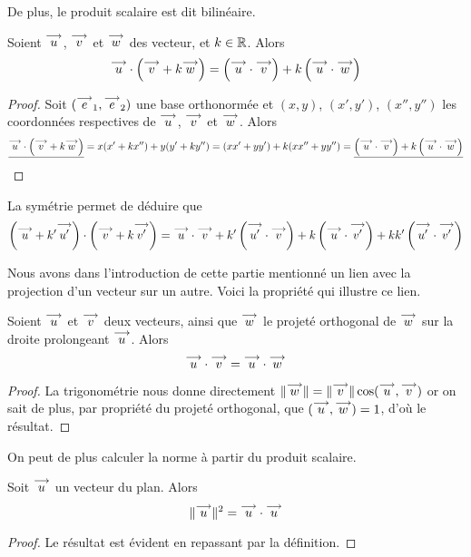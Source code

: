 De plus, le produit scalaire est dit bilinéaire.

\begin{prop}[Bilinéarité]
    Soient $\overset{\longrightarrow}{u}$, $\overset{\longrightarrow}{v}$ et $\overset{\longrightarrow}{w}$ des vecteur, et $k\in\mathbb{R}$. Alors $$ \overset{\longrightarrow}{u}\cdot\left(\overset{\longrightarrow}{v} +k\overset{\longrightarrow}{w}\right)=\left(\overset{\longrightarrow}{u}\cdot \overset{\longrightarrow}{v} \right)+k\left(\overset{\longrightarrow}{u}\cdot \overset{\longrightarrow}{w}\right)$$
\end{prop}
\begin{proof}
    Soit $(\overset{\longrightarrow}{e}_1,\overset{\longrightarrow}{e}_2)$ une base orthonormée et $(x,y)$, $(x',y')$, $(x'',y'')$ les coordonnées respectives de $\overset{\longrightarrow}{u}$, $\overset{\longrightarrow}{v}$ et $\overset{\longrightarrow}{w}$. Alors $$\underline{ \overset{\longrightarrow}{u}\cdot\left(\overset{\longrightarrow}{v} +k\overset{\longrightarrow}{w}\right)} = x(x'+kx'')+y(y'+ky'')=(xx'+yy')+k(xx''+yy'')=\underline{\left(\overset{\longrightarrow}{u}\cdot \overset{\longrightarrow}{v}\right) + k\left(\overset{\longrightarrow}{u}\cdot \overset{\longrightarrow}{w}\right)}$$
\end{proof}

\begin{rmk}
    La symétrie permet de déduire que $$\left(\overset{\longrightarrow}{u}+k'\overset{\longrightarrow}{u'}\right)\cdot\left(\overset{\longrightarrow}{v} +k\overset{\longrightarrow}{v'}\right) = \overset{\longrightarrow}{u}\cdot \overset{\longrightarrow}{v}+k'\left(\overset{\longrightarrow}{u'}\cdot\overset{\longrightarrow}{v}\right)+k\left(\overset{\longrightarrow}{u}\cdot \overset{\longrightarrow}{v'}\right)+kk'\left(\overset{\longrightarrow}{u'}\cdot\overset{\longrightarrow}{v'}\right)$$
\end{rmk}

Nous avons dans l'introduction de cette partie mentionné un lien avec la projection d'un vecteur sur un autre. Voici la propriété qui illustre ce lien.

\begin{prop}\label{projection}
    Soient $\overset{\longrightarrow}{u}$ et $\overset{\longrightarrow}{v}$ deux vecteurs, ainsi que $\overset{\longrightarrow}{w}$ le projeté orthogonal de $\overset{\longrightarrow}{w}$ sur la droite prolongeant $\overset{\longrightarrow}{u}$. Alors $$\overset{\longrightarrow}{u}\cdot \overset{\longrightarrow}{v} = \overset{\longrightarrow}{u} \cdot \overset{\longrightarrow}{w}$$
\end{prop}


\begin{proof}
    La trigonométrie nous donne directement $\|\overset{\longrightarrow}{w}\|=\|\overset{\longrightarrow}{v}\|\cos(\overset{\longrightarrow}{u},\overset{\longrightarrow}{v})$ or on sait de plus, par propriété du projeté orthogonal, que $(\overset{\longrightarrow}{u},\overset{\longrightarrow}{w})=1$, d'où le résultat.
\end{proof}

On peut de plus calculer la norme à partir du produit scalaire.

\begin{prop}
    Soit $\overset{\longrightarrow}{u}$ un vecteur du plan. Alors $$\|\overset{\longrightarrow}{u}\|^2=\overset{\longrightarrow}{u}\cdot\overset{\longrightarrow}{u}$$
\end{prop}
\begin{proof}
    Le résultat est évident en repassant par la définition.
\end{proof}

